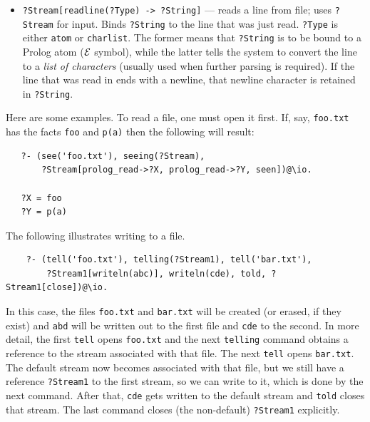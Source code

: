 \documentclass[11pt]{article}
\newcommand{\ERGO}{\mbox{\ensuremath{\cal{E}}\smaller{{\sc{RGO}}}}\xspace}
\newcommand{\FLSYSTEM}{\ERGO}
\newcommand{\bs}{\textbackslash}
\begin{document}
\begin{itemize}
  Note that this method is similar to \texttt{readOneByOne} in the module
  \texttt{\bs{}parse} in Section~\ref{sec-parse-compile}. The difference is
  that it is simpler to use: it does not return any status or error information
  and instead binds \texttt{?Term} to \texttt{flora\_read\_error} in case
  of an error. It also ignores spaces and newlines. 
\item {\tt ?Stream[readline(?Type) -> ?String]} --- reads a line from file;
  uses {\tt ?Stream} for input. Binds \texttt{?String} to the line that was
  just read.  {\tt ?Type} is either
  {\tt atom} or
  {\tt charlist}. The former means that {\tt ?String} is to be bound to a
  Prolog atom (\FLSYSTEM symbol), while
  the latter tells the system to convert the line to a \emph{list of
    characters} (usually used when further parsing is required).  
  If the line that was read in ends with a newline, that newline character is
  retained in \texttt{?String}. 
\end{itemize}

\noindent
Here are some examples.
To read a file, one must open it first. If, say,
\texttt{foo.txt} has the facts \texttt{foo} and \texttt{p(a)} then the
following will result:
\begin{verbatim}
   ?- (see('foo.txt'), seeing(?Stream),
       ?Stream[prolog_read->?X, prolog_read->?Y, seen])@\io.

   ?X = foo
   ?Y = p(a)
\end{verbatim}
The following illustrates writing to a file.
\begin{verbatim}
    ?- (tell('foo.txt'), telling(?Stream1), tell('bar.txt'),
        ?Stream1[writeln(abc)], writeln(cde), told, ?Stream1[close])@\io.
\end{verbatim}
In this case, the files \texttt{foo.txt} and \texttt{bar.txt} will be
created (or erased, if they exist)  and \texttt{abd} will be written out to
the first file and \texttt{cde} to the second.  
In more detail, the first \texttt{tell} opens \texttt{foo.txt} and the next
\texttt{telling} command obtains a reference to the stream associated with
that file. The next \texttt{tell} opens \texttt{bar.txt}. The default
stream now becomes associated with that file, but we still have a reference
\texttt{?Stream1} to the first stream, so we can write to it, which is done
by the next command. After that, \texttt{cde} gets written to the default
stream and \texttt{told} closes that stream. The last command closes (the
non-default) \texttt{?Stream1} explicitly. 
\end{document}
